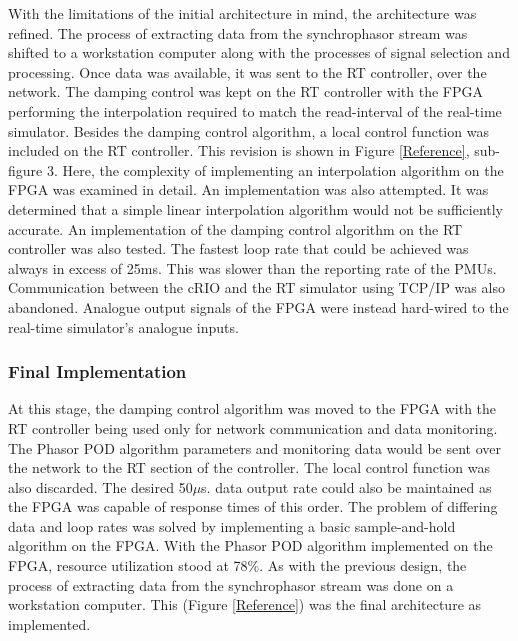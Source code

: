 \documentclass[conference]{IEEEtran}
\begin{document}
With the limitations of the initial architecture in mind, the architecture was refined. The process of  extracting data from the synchrophasor stream was shifted to a workstation computer along with the processes of signal selection and processing. Once data was available, it was sent to the RT controller, over the  network. The damping control was kept on the RT controller with the FPGA performing the interpolation required to match the read-interval of the real-time simulator. Besides the damping control algorithm, a local control function was included on the RT controller. This revision is shown in Figure \ref{Reference}, sub-figure 3. Here, the complexity of implementing an interpolation algorithm on the FPGA was examined in detail. An implementation was also attempted. It was determined that a simple linear interpolation algorithm would not be sufficiently accurate. An implementation of the damping control algorithm on the RT controller was also tested. The fastest loop rate that could be achieved was always in excess of 25ms. This was slower than the reporting rate of the PMUs. Communication between the cRIO and the RT simulator using TCP/IP was also abandoned. Analogue output signals of the FPGA were instead hard-wired to the real-time simulator's analogue inputs.
\subsubsection{Final Implementation}

At this stage, the damping control algorithm was moved to the FPGA with the RT controller being used only for network communication and data monitoring. The  Phasor POD algorithm parameters and monitoring data would be sent over the network to the RT section of the controller. The local control function was also discarded. The desired 50$\mu$s. data output rate could also be maintained as the FPGA was capable of response times of this order. The problem of differing data and loop rates was solved by implementing a basic sample-and-hold algorithm on the FPGA. With the Phasor POD algorithm implemented on the FPGA, resource utilization stood at 78\%. As with the previous design, the process of extracting data from the synchrophasor stream was done on a workstation computer. This (Figure \ref{Reference}) was the final architecture as implemented. %
\end{document}
